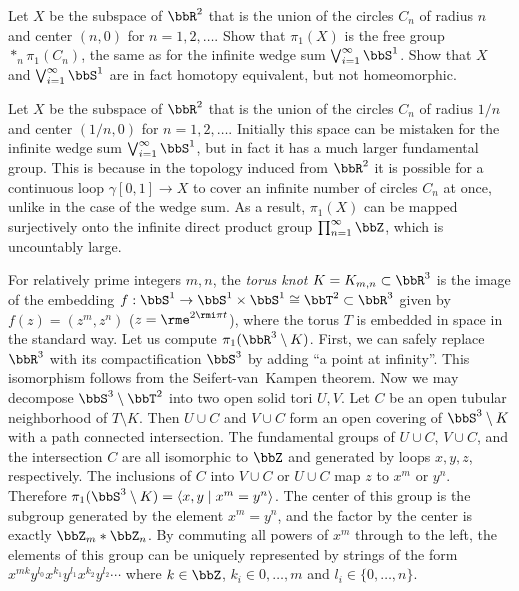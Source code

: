 \begin{xca}
    Let $X$ be the subspace of $\bbR^2$ that is the union of the circles $C_n$ of radius $n$ and center $(n, 0)$ for $n = 1, 2, \ldots$. Show that $\pi_1( X )$ is the free group $\ast_n \pi_1( C_n )$, the same as for the infinite wedge sum $\bigvee_{i=1}^\infty \bbS^1$. Show that $X$ and $\bigvee_{i=1}^\infty \bbS^1$ are in fact homotopy equivalent, but not homeomorphic.
\end{xca}

\begin{example}\label{hawaiian earring}
    Let $X$ be the subspace of $\bbR^2$ that is the union of the circles $C_n$ of radius $1/n$ and center $(1/n, 0)$ for $n = 1, 2, \ldots$. Initially this space can be mistaken for the infinite wedge sum $\bigvee_{i=1}^\infty \bbS^1$, but in fact it has a much larger fundamental group. This is because in the topology induced from $\bbR^2$ it is possible for a continuous loop $\gamma[0,1]\to X$ to cover an infinite number of circles $C_n$ at once, unlike in the case of the wedge sum. As a result, $\pi_1(X)$ can be mapped surjectively onto the infinite direct product group $\prod_{n=1}^\infty \bbZ$, which is uncountably large. 
\end{example}

\begin{example}
    For relatively prime integers $m,n$, the \emph{torus knot} $K=K_{m,n}\subset \bbR^3$ is the image of the embedding $f:\bbS^1\to \bbS^1\times \bbS^1\cong \bbT^2\subset\bbR^3$ given by $f(z)=(z^m,z^n)$ ($z=\rme^{2\rmi\pi t}$), where the torus $T$ is embedded in space in the standard way. Let us compute $\pi_1(\bbR^3\setminus K)$. First, we can safely replace $\bbR^3$ with its compactification $\bbS^3$ by adding ``a point at infinity''. This isomorphism follows from the Seifert-van~Kampen theorem. Now we may decompose $\bbS^3\setminus \bbT^2$ into two open solid tori $U,V$. Let $C$ be an open tubular neighborhood of $T\setminus K$. Then $U\cup C$ and $V\cup C$ form an open covering of $\bbS^3\setminus K$ with a path connected intersection. The fundamental groups of $U\cup C$, $V\cup C$, and the intersection $C$ are all isomorphic to $\bbZ$ and generated by loops $x,y,z$, respectively. The inclusions of $C$ into $V\cup C$ or $U\cup C$ map $z$ to $x^m$ or $y^n$. Therefore $\pi_1(\bbS^3\setminus K)=\langle x,y\mid x^m=y^n\rangle$. The center of this group is the subgroup generated by the element $x^m=y^n$, and the factor by the center is exactly $\bbZ_m\ast\bbZ_n$. By commuting all powers of $x^m$ through to the left, the elements of this group can be uniquely represented by strings of the form $x^{mk}y^{l_0}x^{k_1}y^{l_1}x^{k_2}y^{l_2}\cdots$ where $k\in\bbZ$, $k_i\in {0,\ldots,m}$ and $l_i\in\{0,\ldots,n\}$.
\end{example}

